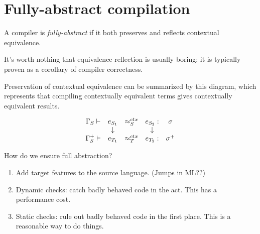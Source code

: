 \documentclass[11pt]{article}
\newcommand{\ctxeq}{\approx^{ctx}}
\begin{document}
% 
% 

\section{Fully-abstract compilation}

\begin{defn}
  A compiler is \emph{fully-abstract} if it both preserves and reflects
  contextual equivalence.
\end{defn}

It's worth nothing that equivalence reflection is usually boring: it is
typically proven as a corollary of compiler correctness.

Preservation of contextual equivalence can be summarized by this diagram, which
represents that compiling contextually equivalent terms gives contextually
equivalent results.

\[
\begin{array}{ccccc}
  \Gamma_S \proves  & e_{S_1}  & \ctxeq_S & e_{S_2} : & \sigma  \\
  ~                 & \downarrow & ~       & \downarrow & ~ \\
  \Gamma_S^+ \proves & e_{T_1} & \ctxeq_T & e_{T_2} : & \sigma^+
\end{array}
\]

How do we ensure full abstraction?
\begin{enumerate}
\item Add target features to the source language. (Jumps in ML??)
\item Dynamic checks: catch badly behaved code in the act. This has a
  performance cost.
\item Static checks: rule out badly behaved code in the first place.
  This is a reasonable way to do things.
\end{enumerate}
\end{document}

